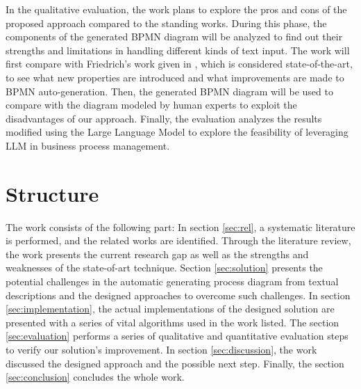 In the qualitative evaluation, the work plans to explore the pros and cons of the proposed approach compared to the standing works. During this phase, the components of the generated BPMN diagram will be analyzed to find out their strengths and limitations in handling different kinds of text input. The work will first compare with Friedrich's work given in \cite{t2m_1_main}, which is considered state-of-the-art, to see what new properties are introduced and what improvements are made to BPMN auto-generation. Then, the generated BPMN diagram will be used to compare with the diagram modeled by human experts to exploit the disadvantages of our approach. Finally, the evaluation analyzes the results modified using the Large Language Model to explore the feasibility of leveraging LLM in business process management. 


\section{Structure}
\label{sec:intro:struct}
The work consists of the following part: In section \ref{sec:rel}, a systematic literature is performed, and the related works are identified. Through the literature review, the work presents the current research gap as well as the strengths and weaknesses of the state-of-art technique. Section \ref{sec:solution} presents the potential challenges in the automatic generating process diagram from textual descriptions and the designed approaches to overcome such challenges. In section \ref{sec:implementation}, the actual implementations of the designed solution are presented with a series of vital algorithms used in the work listed. The section \ref{sec:evaluation} performs a series of qualitative and quantitative evaluation steps to verify our solution's improvement. In section \ref{sec:discussion}, the work discussed the designed approach and the possible next step. Finally, the section \ref{sec:conclusion} concludes the whole work.


